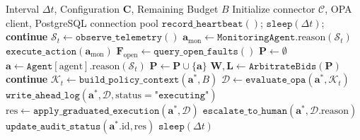 \begin{algorithm}[!t]
\caption{\textsc{Acde} Autonomous Supervisory Control Loop}
\label{alg:control_loop}
\begin{algorithmic}[1]
\Require Interval $\Delta t$, Configuration $\mathbf{C}$, Remaining Budget $B$
\State Initialize connector $\mathcal{C}$, OPA client, PostgreSQL connection pool
    \State $\texttt{record\_heartbeat}()$; 
        \State $\texttt{sleep}(\Delta t)$; \textbf{continue}
    \EndIf
    \State $\mathcal{S}_t \leftarrow \texttt{observe\_telemetry}()$
        \State $\mathbf{a}_{\text{mon}} \leftarrow \texttt{MonitoringAgent}.\text{reason}(\mathcal{S}_t)$
        \State $\texttt{execute\_action}(\mathbf{a}_{\text{mon}})$
    \EndIf
    \State $\mathbf{F}_{\text{open}} \leftarrow \texttt{query\_open\_faults}()$
        \State $\mathbf{P} \leftarrow \emptyset$
                \State $\mathbf{a} \leftarrow \texttt{Agent}[\text{agent}].\text{reason}(\mathcal{S}_t)$
                    \State $\mathbf{P} \leftarrow \mathbf{P} \cup \{\mathbf{a}\}$
                \EndIf
            \EndIf
        \EndFor
        \State $\mathbf{W}, \mathbf{L} \leftarrow \texttt{ArbitrateBids}(\mathbf{P})$ 
                \State \textbf{continue}
            \EndIf
                \State $\mathcal{K}_t \leftarrow \texttt{build\_policy\_context}(\mathbf{a}^*, B)$
                \State $\mathcal{D} \leftarrow \texttt{evaluate\_opa}(\mathbf{a}^*, \mathcal{K}_t)$
                \State $\texttt{write\_ahead\_log}(\mathbf{a}^*, \mathcal{D}, \text{status}=\texttt{"executing"})$
                    \State $\text{res} \leftarrow \texttt{apply\_graduated\_execution}(\mathbf{a}^*, \mathcal{D})$
                    \State $\texttt{escalate\_to\_human}(\mathbf{a}^*, \mathcal{D}.\text{reason})$
                \EndIf
                \State $\texttt{update\_audit\_status}(\mathbf{a}^*.\text{id}, \text{res})$
            \EndWith
        \EndFor
    \EndIf
    \State $\texttt{sleep}(\Delta t)$
\EndWhile
\end{algorithmic}
\end{algorithm}

